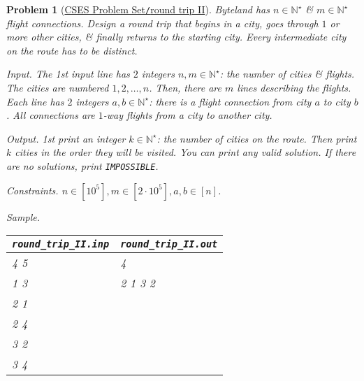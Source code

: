 \documentclass{article}
\newtheorem{problem}{Problem}
\begin{document}
\begin{problem}[\href{https://cses.fi/problemset/task/1678}{CSES Problem Set{\tt/}round trip II}]
    Byteland has $n\in\mathbb{N}^\star$ \& $m\in\mathbb{N}^\star$ flight connections. Design a round trip that begins in a city, goes through $1$ or more other cities, \& finally returns to the starting city. Every intermediate city on the route has to be distinct.
    \item {\sf Input.} The 1st input line has $2$ integers $n,m\in\mathbb{N}^\star$: the number of cities \& flights. The cities are numbered $1,2,\ldots,n$. Then, there are $m$ lines describing the flights. Each line has $2$ integers $a,b\in\mathbb{N}^\star$: there is a flight connection from city $a$ to city $b$. All connections are $1$-way flights from a city to another city.
    \item {\sf Output.} 1st print an integer $k\in\mathbb{N}^\star$: the number of cities on the route. Then print $k$ cities in the order they will be visited. You can print any valid solution. If there are no solutions, print {\tt IMPOSSIBLE}.
    \item {\sf Constraints.} $n\in[10^5],m\in[2\cdot10^5],a,b\in[n]$.
    \item {\sf Sample.}
    \begin{table}[H]
        \centering
        \begin{tabular}{|l|l|}
            \hline
            \verb|round_trip_II.inp| & \verb|round_trip_II.out| \\
            \hline
            4 5 & 4 \\
            1 3 & 2 1 3 2 \\
            2 1 & \\
            2 4 & \\
            3 2 & \\
            3 4 & \\
            \hline
        \end{tabular}
    \end{table}
\end{problem}
\end{document}
